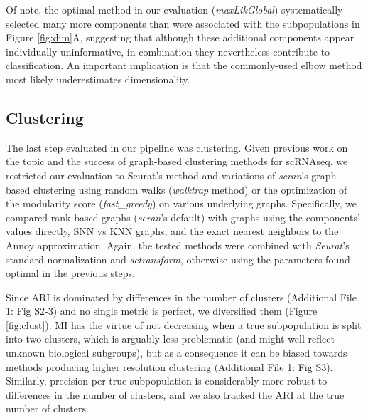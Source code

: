 \documentclass{bmcart}
\begin{document}
Of note, the optimal method in our evaluation (\textit{maxLikGlobal}) systematically selected many more components than were associated with the subpopulations in Figure \ref{fig:dim}A, suggesting that although these additional components appear individually uninformative, in combination they nevertheless contribute to classification. An important implication is that the commonly-used elbow method most likely underestimates dimensionality.


\subsection*{Clustering}

The last step evaluated in our pipeline was clustering. Given previous work on the topic \cite{duoClustering2018,freytagComparison2018} and the success of graph-based clustering methods for scRNAseq, we restricted our evaluation to Seurat's method and variations of \textit{scran}'s graph-based clustering using random walks (\textit{walktrap} method) or the optimization of the modularity score (\textit{fast\_greedy}) on various underlying graphs. Specifically, we compared rank-based graphs (\textit{scran}'s default) with graphs using the components' values directly, SNN vs KNN graphs, and the exact nearest neighbors to the Annoy approximation. Again, the tested methods were combined with \textit{Seurat}'s standard normalization and \textit{sctransform}, otherwise using the parameters found optimal in the previous steps. 

Since ARI is dominated by differences in the number of clusters (Additional File 1: Fig S2-3) and no single metric is perfect, we diversified them (Figure \ref{fig:clust}). MI has the virtue of not decreasing when a true subpopulation is split into two clusters, which is arguably less problematic (and might well reflect unknown biological subgroups), but as a consequence it can be biased towards methods producing higher resolution clustering (Additional File 1: Fig S3). Similarly, precision per true subpopulation is considerably more robust to differences in the number of clusters, and we also tracked the ARI at the true number of clusters. 
\end{document}

